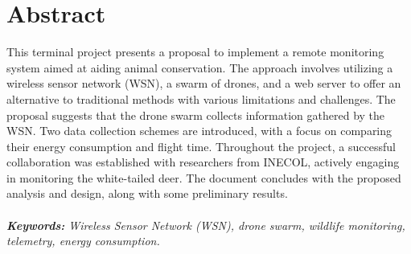 \chapter{Abstract}

This terminal project presents a proposal to implement a remote monitoring system aimed at aiding animal conservation. The approach involves utilizing a wireless sensor network (WSN), a swarm of drones, and a web server to offer an alternative to traditional methods with various limitations and challenges. The proposal suggests that the drone swarm collects information gathered by the WSN. Two data collection schemes are introduced, with a focus on comparing their energy consumption and flight time. Throughout the project, a successful collaboration was established with researchers from INECOL, actively engaging in monitoring the white-tailed deer. The document concludes with the proposed analysis and design, along with some preliminary results.
\\ \\
\noindent \textit{\textbf{Keywords:} Wireless Sensor Network (WSN), drone swarm, wildlife monitoring, telemetry, energy consumption.} \\


\endinput 